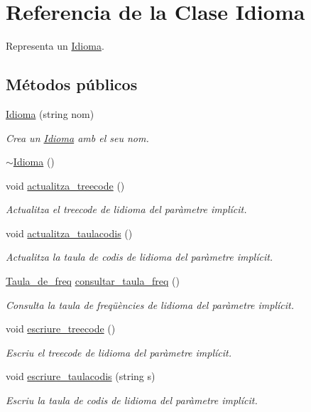 \hypertarget{class_idioma}{}\section{Referencia de la Clase Idioma}
\label{class_idioma}


Representa un \hyperlink{class_idioma}{Idioma}.  


\subsection*{Métodos públicos}
\begin{DoxyCompactItemize}
\item 
\hyperlink{class_idioma_acb367feda82c466b5c61378636b901b6}{Idioma} (string nom)
\begin{DoxyCompactList}\small\item\em Crea un \hyperlink{class_idioma}{Idioma} amb el seu nom. \end{DoxyCompactList}\item 
\hyperlink{class_idioma_a80c90f8c9a7f824d7d7d171b9face201}{$\sim$\+Idioma} ()
\item 
void \hyperlink{class_idioma_afcdc214d9490b61d54e35da85f2354a4}{actualitza\+\_\+treecode} ()
\begin{DoxyCompactList}\small\item\em Actualitza el treecode de l\textquotesingle{}idioma del paràmetre implícit. \end{DoxyCompactList}\item 
void \hyperlink{class_idioma_ac089a0e4b79ca8f3df040e204a3de7dd}{actualitza\+\_\+taulacodis} ()
\begin{DoxyCompactList}\small\item\em Actualitza la taula de codis de l\textquotesingle{}idioma del paràmetre implícit. \end{DoxyCompactList}\item 
\hyperlink{class_taula__de__freq}{Taula\+\_\+de\+\_\+freq} \hyperlink{class_idioma_a3d06a9d14291a5b59e0de1a65512ed80}{consultar\+\_\+taula\+\_\+freq} ()
\begin{DoxyCompactList}\small\item\em Consulta la taula de freqüències de l\textquotesingle{}idioma del paràmetre implícit. \end{DoxyCompactList}\item 
void \hyperlink{class_idioma_a2c3024b18da125926668a2df2b178992}{escriure\+\_\+treecode} ()
\begin{DoxyCompactList}\small\item\em Escriu el treecode de l\textquotesingle{}idioma del paràmetre implícit. \end{DoxyCompactList}\item 
void \hyperlink{class_idioma_a4f1102ff409d13738ff09268e8e045da}{escriure\+\_\+taulacodis} (string s)
\begin{DoxyCompactList}\small\item\em Escriu la taula de codis de l\textquotesingle{}idioma del paràmetre implícit. \end{DoxyCompactList}\end{DoxyCompactItemize}


